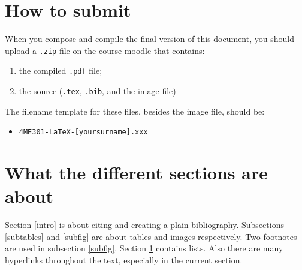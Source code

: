 \documentclass[10pt]{article}
\begin{document}
\section{How to submit} \label{submit}
\par {When you compose and compile the final version of this document, you should upload a \texttt {.zip} file on the course moodle that contains:}
\begin{enumerate}
	\item the compiled \texttt{.pdf} file;
	\item the source (\texttt{.tex}, \texttt{.bib}, and the image file)
\end{enumerate}
\par \noindent The filename template for these files, besides the image file, should be:
\begin{itemize}
\item \texttt{4ME301-LaTeX-[yoursurname].xxx}
\end{itemize}
\section{What the different sections are about}
\par {Section \ref{intro} is about citing and creating a plain bibliography. Subsections \ref{subtables} and \ref{subfig} are about tables and images respectively. Two footnotes are used in subsection \ref{subfig}. Section \ref{submit} contains lists. Also there are many hyperlinks throughout the text, especially in the current section.}




\listoffigures
\listoftables
\end{document}
